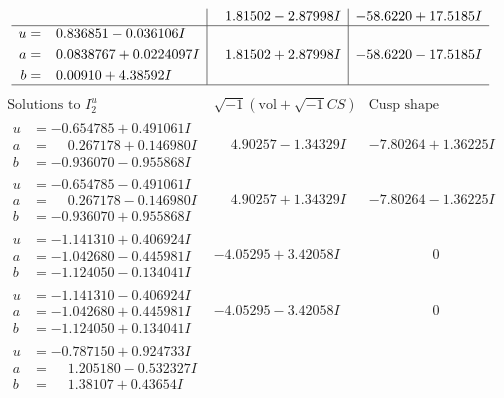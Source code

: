 \documentclass[1p]{elsarticle_modified}
\theoremstyle{definition}
\newcommand{\I}{\sqrt{-1}}
\begin{document}
$$\begin{array}{c|c|c}
 & \phantom{-}1.81502 - 2.87998 I & -58.6220 + 17.5185 I \\ \hline\begin{aligned}
u &= \phantom{-}0.836851 - 0.036106 I \\
a &= \phantom{-}0.0838767 + 0.0224097 I \\
b &= \phantom{-}0.00910 + 4.38592 I\end{aligned}
 & \phantom{-}1.81502 + 2.87998 I & -58.6220 - 17.5185 I\\
 \hline 
 \end{array}$$\newpage$$\begin{array}{c|c|c}  
\text{Solutions to }I^u_{2}& \I (\text{vol} + \sqrt{-1}CS) & \text{Cusp shape}\\
 \hline 
\begin{aligned}
u &= -0.654785 + 0.491061 I \\
a &= \phantom{-}0.267178 + 0.146980 I \\
b &= -0.936070 - 0.955868 I\end{aligned}
 & \phantom{-}4.90257 - 1.34329 I & -7.80264 + 1.36225 I \\ \hline\begin{aligned}
u &= -0.654785 - 0.491061 I \\
a &= \phantom{-}0.267178 - 0.146980 I \\
b &= -0.936070 + 0.955868 I\end{aligned}
 & \phantom{-}4.90257 + 1.34329 I & -7.80264 - 1.36225 I \\ \hline\begin{aligned}
u &= -1.141310 + 0.406924 I \\
a &= -1.042680 - 0.445981 I \\
b &= -1.124050 - 0.134041 I\end{aligned}
 & -4.05295 + 3.42058 I & \phantom{-0.000000 } 0 \\ \hline\begin{aligned}
u &= -1.141310 - 0.406924 I \\
a &= -1.042680 + 0.445981 I \\
b &= -1.124050 + 0.134041 I\end{aligned}
 & -4.05295 - 3.42058 I & \phantom{-0.000000 } 0 \\ \hline\begin{aligned}
u &= -0.787150 + 0.924733 I \\
a &= \phantom{-}1.205180 - 0.532327 I \\
b &= \phantom{-}1.38107 + 0.43654 I\end{aligned}

\end{array}$$
\end{document}
